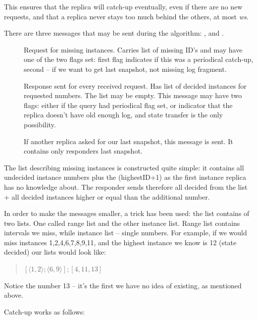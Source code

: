 This ensures that the replica will catch-up eventually, even if there are no new requests, and that a replica never stays too much behind the others, at most \textit{ws}.

There are three messages that may be sent during the algorithm: \catchUpQuery[], \catchUpResponse and \catchUpSnapshot[].
\begin{description}
 \item[\normalfont\catchUpQuery] Request for missing instances. Carries list of missing ID's and may have one of the two flags set: first flag indicates if this was a periodical catch-up, second -- if we want to get last snapshot, not missing log fragment.
 \item[\normalfont\catchUpResponse] Response sent for every received request. Has list of decided instances for requested numbers. The list may be empty. This message may have two flags: either if the query had periodical flag set, or indicator that the replica doesn't have old enough log, and state transfer is the only possibility.
 \item[\normalfont\catchUpSnapshot] If another replica asked for our last snapshot, this message is sent. It contains only responders last snapshot.
\end{description}

The list describing missing instances is constructed quite simple: it contains all undecided instance numbers plus the (highestID+1) as the first instance replica has no knowledge about. The responder sends therefore all decided from the list + all decided instances higher or equal than the additional number.

In order to make the messages smaller, a trick has been used: the list contains of two lists. One called range list and the other instance list.
Range list contains intervals we miss, while instance list -- single numbers. For example, if we would miss instances 1,2,4,6,7,8,9,11, and the highest instance we know is 12 (state decided) our lists would look like:
\begin{quote}
$[\langle1,2\rangle; \langle6,9\rangle]; [4,11,13]$
\end{quote} 
Notice the number 13 -- it's the first we have no idea of existing, as mentioned above.

Catch-up works as follows:

